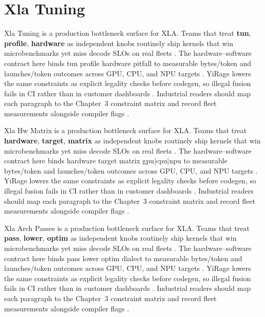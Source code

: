 \section{Xla Tuning}
\label{sec:xla_tuning}

Xla Tuning is a production bottleneck surface for XLA. Teams that treat \textbf{tun}, \textbf{profile}, \textbf{hardware} as independent knobs routinely ship kernels that win microbenchmarks yet miss decode SLOs on real fleets \citep{nvidia2022hopper,amd2024aie}. The hardware--software contract here binds tun profile hardware pitfall to measurable bytes/token and launches/token outcomes across GPU, CPU, and NPU targets \citep{semianalysis2024tma,dlbook}. YiRage lowers the same constraints as explicit legality checks before codegen, so illegal fusion fails in CI rather than in customer dashboards \citep{amd2024xdna,dao2022flashattention}. Industrial readers should map each paragraph to the Chapter~3 constraint matrix and record fleet measurements alongside compiler flags \citep{amd2024aie,kwon2023vllm}.

Xla Hw Matrix is a production bottleneck surface for XLA. Teams that treat \textbf{hardware}, \textbf{target}, \textbf{matrix} as independent knobs routinely ship kernels that win microbenchmarks yet miss decode SLOs on real fleets \citep{taxbreak2026,semianalysis2024tma}. The hardware--software contract here binds hardware target matrix gpu|cpu|npu to measurable bytes/token and launches/token outcomes across GPU, CPU, and NPU targets \citep{memoryfloor2026,amd2024xdna}. YiRage lowers the same constraints as explicit legality checks before codegen, so illegal fusion fails in CI rather than in customer dashboards \citep{nvidia2022hopper,amd2024aie}. Industrial readers should map each paragraph to the Chapter~3 constraint matrix and record fleet measurements alongside compiler flags \citep{semianalysis2024tma,dlbook}.

Xla Arch Passes is a production bottleneck surface for XLA. Teams that treat \textbf{pass}, \textbf{lower}, \textbf{optim} as independent knobs routinely ship kernels that win microbenchmarks yet miss decode SLOs on real fleets \citep{memoryfloor2026,amd2024xdna}. The hardware--software contract here binds pass lower optim dialect to measurable bytes/token and launches/token outcomes across GPU, CPU, and NPU targets \citep{nvidia2022hopper,amd2024aie}. YiRage lowers the same constraints as explicit legality checks before codegen, so illegal fusion fails in CI rather than in customer dashboards \citep{semianalysis2024tma,dlbook}. Industrial readers should map each paragraph to the Chapter~3 constraint matrix and record fleet measurements alongside compiler flags \citep{amd2024xdna,dao2022flashattention}.

